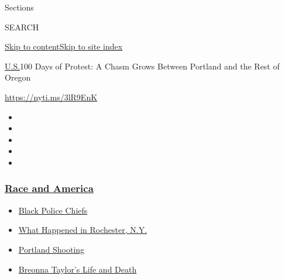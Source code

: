 Sections

SEARCH

\protect\hyperlink{site-content}{Skip to
content}\protect\hyperlink{site-index}{Skip to site index}

\href{/section/us}{U.S.}\textbar{}100 Days of Protest: A Chasm Grows
Between Portland and the Rest of Oregon

\url{https://nyti.ms/3lR9EnK}

\begin{itemize}
\item
\item
\item
\item
\item
\end{itemize}

\hypertarget{race-and-america}{%
\subsubsection{\texorpdfstring{\href{https://www.nytimes3xbfgragh.onion/news-event/george-floyd-protests-minneapolis-new-york-los-angeles?name=styln-george-floyd\&region=TOP_BANNER\&block=storyline_menu_recirc\&action=click\&pgtype=Article\&impression_id=f546fb10-f52b-11ea-9829-2300db455254\&variant=undefined}{Race
and America}}{Race and America}}\label{race-and-america}}

\begin{itemize}
\tightlist
\item
  \href{https://www.nytimes3xbfgragh.onion/2020/09/11/us/black-police-chiefs-reform.html?name=styln-george-floyd\&region=TOP_BANNER\&block=storyline_menu_recirc\&action=click\&pgtype=Article\&impression_id=f546fb11-f52b-11ea-9829-2300db455254\&variant=undefined}{Black
  Police Chiefs}
\item
  \href{https://www.nytimes3xbfgragh.onion/2020/09/04/nyregion/rochester-police-daniel-prude.html?name=styln-george-floyd\&region=TOP_BANNER\&block=storyline_menu_recirc\&action=click\&pgtype=Article\&impression_id=f5472220-f52b-11ea-9829-2300db455254\&variant=undefined}{What
  Happened in Rochester, N.Y.}
\item
  \href{https://www.nytimes3xbfgragh.onion/2020/08/30/us/portland-shooting-explained.html?name=styln-george-floyd\&region=TOP_BANNER\&block=storyline_menu_recirc\&action=click\&pgtype=Article\&impression_id=f5472221-f52b-11ea-9829-2300db455254\&variant=undefined}{Portland
  Shooting}
\item
  \href{https://www.nytimes3xbfgragh.onion/2020/08/30/us/breonna-taylor-police-killing.html?name=styln-george-floyd\&region=TOP_BANNER\&block=storyline_menu_recirc\&action=click\&pgtype=Article\&impression_id=f5472222-f52b-11ea-9829-2300db455254\&variant=undefined}{Breonna
  Taylor's Life and Death}
\end{itemize}

